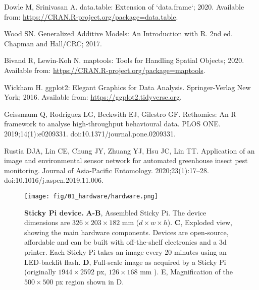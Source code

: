 \documentclass[12pt]{article}
\begin{document}
\begin{thebibliography}{10}
	Dowle M, Srinivasan A.
	\newblock data.table: {Extension} of `data.frame`; 2020.
	\newblock Available from: \url{https://CRAN.R-project.org/package=data.table}.
	
	Wood SN.
	\newblock Generalized {Additive} {Models}: {An} {Introduction} with {R}.
	\newblock 2nd ed. Chapman and Hall/CRC; 2017.
	
	Bivand R, Lewin-Koh N.
	\newblock maptools: {Tools} for {Handling} {Spatial} {Objects}; 2020.
	\newblock Available from: \url{https://CRAN.R-project.org/package=maptools}.
	
	Wickham H.
	\newblock ggplot2: {Elegant} {Graphics} for {Data} {Analysis}.
	\newblock Springer-Verlag New York; 2016.
	\newblock Available from: \url{https://ggplot2.tidyverse.org}.
	
	Geissmann Q, Rodriguez LG, Beckwith EJ, Gilestro GF.
	\newblock Rethomics: {An} {R} framework to analyse high-throughput behavioural
	data.
	\newblock PLOS ONE. 2019;14(1):e0209331.
	\newblock doi:{10.1371/journal.pone.0209331}.
	
	Rustia DJA, Lin CE, Chung JY, Zhuang YJ, Hsu JC, Lin TT.
	\newblock Application of an image and environmental sensor network for
	automated greenhouse insect pest monitoring.
	\newblock Journal of Asia-Pacific Entomology. 2020;23(1):17--28.
	\newblock doi:{10.1016/j.aspen.2019.11.006}.
	
\end{thebibliography}
	
	
	
	\pagebreak
	\begin{figure}[ht]
		\centering
		\texttt{[image: fig/01\_hardware/hardware.png]}
		\caption{\textbf{Sticky Pi device.} \textbf{A-B}, Assembled Sticky Pi. The device dimensions are $326 \times{} 203 \times{} 182$ mm ($d \times{} w \times{} h$). \textbf{C}, Exploded view, showing the main hardware components. Devices are open-source, affordable and can be built with off-the-shelf electronics and a 3d printer. Each Sticky Pi takes an image every 20 minutes using an LED-backlit flash. \textbf{D}, Full-scale image as acquired by a Sticky Pi (originally $1944 \times{} 2592$ px, $126 \times{} 168$ mm ). E, Magnification of the $500 \times{} 500$ px region shown in D.}
		\label{fig:01}
	\end{figure}
	\pagebreak
	
\end{document}
